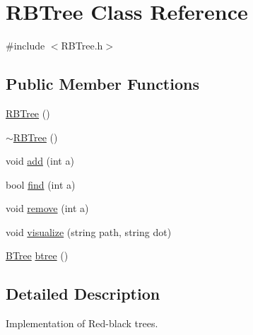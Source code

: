 \hypertarget{class_r_b_tree}{\section{R\+B\+Tree Class Reference}
\label{class_r_b_tree}
}


{\ttfamily \#include $<$R\+B\+Tree.\+h$>$}

\subsection*{Public Member Functions}
\begin{DoxyCompactItemize}
\item 
\hyperlink{class_r_b_tree_a19921f34f32f777bb3c4b85d4ff1d9de}{R\+B\+Tree} ()
\item 
\hyperlink{class_r_b_tree_abab51e54e07c1adf0ca0c9a5d466427b}{$\sim$\+R\+B\+Tree} ()
\item 
void \hyperlink{class_r_b_tree_aaef91e62ae3d9336a18e092ba215531c}{add} (int a)
\item 
bool \hyperlink{class_r_b_tree_ac1594242c7041276d19e6401a19967b5}{find} (int a)
\item 
void \hyperlink{class_r_b_tree_ad97264bea3841ae448837202624cc363}{remove} (int a)
\item 
void \hyperlink{class_r_b_tree_a347654f976da557cedc0f3fc9814c1de}{visualize} (string path, string dot)
\item 
\hyperlink{class_b_tree}{B\+Tree} \hyperlink{class_r_b_tree_a06ee8feaf9fe98cfad71498a8890c08c}{btree} ()
\end{DoxyCompactItemize}


\subsection{Detailed Description}
Implementation of Red-\/black trees. 

